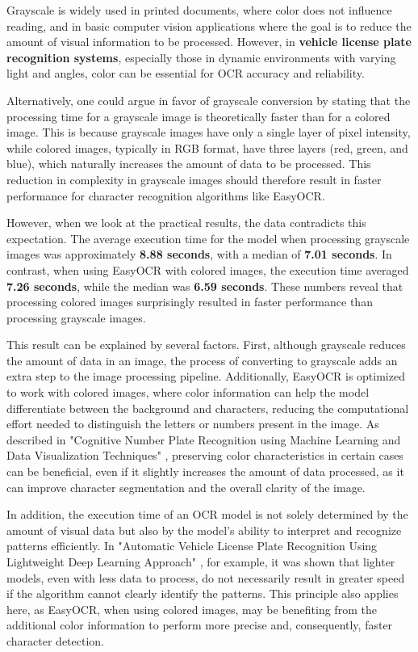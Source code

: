 \documentclass[conference]{IEEEtran}
\begin{document}
	Grayscale is widely used in printed documents, where color does not influence reading, and in basic computer vision applications where the goal is to reduce the amount of visual information to be processed. However, in \textbf{vehicle license plate recognition systems}, especially those in dynamic environments with varying light and angles, color can be essential for OCR accuracy and reliability.
	
	Alternatively, one could argue in favor of grayscale conversion by stating that the processing time for a grayscale image is theoretically faster than for a colored image. This is because grayscale images have only a single layer of pixel intensity, while colored images, typically in RGB format, have three layers (red, green, and blue), which naturally increases the amount of data to be processed. This reduction in complexity in grayscale images should therefore result in faster performance for character recognition algorithms like EasyOCR.
	
	However, when we look at the practical results, the data contradicts this expectation. The average execution time for the model when processing grayscale images was approximately \textbf{8.88 seconds}, with a median of \textbf{7.01 seconds}. In contrast, when using EasyOCR with colored images, the execution time averaged \textbf{7.26 seconds}, while the median was \textbf{6.59 seconds}. These numbers reveal that processing colored images surprisingly resulted in faster performance than processing grayscale images.
	
	This result can be explained by several factors. First, although grayscale reduces the amount of data in an image, the process of converting to grayscale adds an extra step to the image processing pipeline. Additionally, EasyOCR is optimized to work with colored images, where color information can help the model differentiate between the background and characters, reducing the computational effort needed to distinguish the letters or numbers present in the image. As described in "Cognitive Number Plate Recognition using Machine Learning and Data Visualization Techniques" \cite{b6}, preserving color characteristics in certain cases can be beneficial, even if it slightly increases the amount of data processed, as it can improve character segmentation and the overall clarity of the image.
	
	In addition, the execution time of an OCR model is not solely determined by the amount of visual data but also by the model's ability to interpret and recognize patterns efficiently. In "Automatic Vehicle License Plate Recognition Using Lightweight Deep Learning Approach" \cite{b5}, for example, it was shown that lighter models, even with less data to process, do not necessarily result in greater speed if the algorithm cannot clearly identify the patterns. This principle also applies here, as EasyOCR, when using colored images, may be benefiting from the additional color information to perform more precise and, consequently, faster character detection.
	
\end{document}
